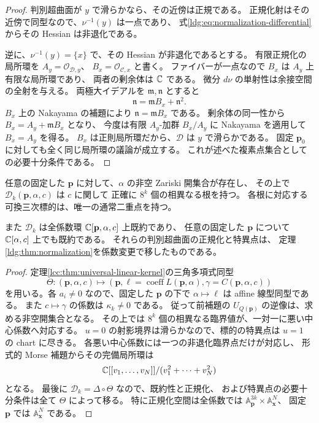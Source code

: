 \begin{proof}
判別超曲面が $y$ で滑らかなら、その近傍は正規である。
正規化射はその近傍で同型なので、$\nu^{-1}(y)$ は一点であり、
式\eqref{ldg:eq:normalization-differential}からその Hessian は非退化である。

逆に、$\nu^{-1}(y)=\{x\}$ で、その Hessian が非退化であるとする。
有限正規化の局所環を $A_y=\mathcal O_{\mathscr D,y}$、
$B_x=\mathcal O_{\mathscr C,x}$ と書く。
ファイバーが一点なので $B_x$ は $A_y$ 上有限な局所環であり、
両者の剰余体は $\mathbb C$ である。
微分 $d\nu$ の単射性は余接空間の全射を与える。
両極大イデアルを $\mathfrak m,\mathfrak n$ とすると
\[
 \mathfrak n=\mathfrak mB_x+\mathfrak n^2.
\]
$B_x$ 上の Nakayama の補題により
$\mathfrak n=\mathfrak mB_x$ である。
剰余体の同一性から $B_x=A_y+\mathfrak mB_x$ となり、
今度は有限 $A_y$-加群 $B_x/A_y$ に Nakayama を適用して $B_x=A_y$ を得る。
$B_x$ は正則局所環だから、$\mathscr D$ は $y$ で滑らかである。
固定 $\mathbf p_0$ に対しても全く同じ局所環の議論が成立する。
これが述べた複素点集合としての必要十分条件である。
\end{proof}

\begin{corollary}[各固定線形係数での単純な悪い中心値]
\label{ldg:cor:fixed-linear-parameters}
任意の固定した $\mathbf p$ に対して、$\alpha$ の非空 Zariski 開集合が存在し、
その上で $\mathscr D_k(\mathbf p,\alpha,c)$ は $c$ に関して
正確に $8^k$ 個の相異なる根を持つ。
各根に対応する可換三次標的は、唯一の通常二重点を持つ。

また $\mathscr D_k$ は全係数環 $\mathbb C[\mathbf p,\alpha,c]$ 上既約であり、
任意の固定した $\mathbf p$ について $\mathbb C[\alpha,c]$ 上でも既約である。
それらの判別超曲面の正規化と特異点は、
定理\ref{ldg:thm:normalization}を係数変更で移したものである。
\end{corollary}

\begin{proof}
定理\ref{lcc:thm:universal-linear-kernel}の三角多項式同型
\[
 \Theta:(\mathbf p,\alpha,c)\longmapsto
      (\mathbf p,\ell=\operatorname{coeff}L(\mathbf p,\alpha),
       \gamma=C(\mathbf p,\alpha,c))
\]
を用いる。各 $a_i\ne0$ なので、固定した $\mathbf p$ の下で
$\alpha\mapsto\ell$ は affine 線型同型である。
また $c\mapsto\gamma$ の係数は $\kappa_k\ne0$ である。
従って前補題の $U_{Q(\mathbf p)}$ の逆像は、求める非空開集合となる。
その上では $8^k$ 個の相異なる臨界値が、一対一に悪い中心係数へ対応する。
$u=0$ の射影境界は滑らかなので、標的の特異点は $u=1$ の chart に尽きる。
各悪い中心係数には一つの非退化臨界点だけが対応し、
形式的 Morse 補題からその完備局所環は
\[
 \mathbb C[[v_1,\ldots,v_N]]/(v_1^2+\cdots+v_N^2)
\]
となる。
最後に $\mathscr D_k=\Delta\circ\Theta$ なので、既約性と正規化、
および特異点の必要十分条件は全て $\Theta$ によって移る。
特に正規化空間は全係数では
$\mathbb A^{3k}_{\mathbf p}\times\mathbb A^N_{\mathbf x}$、
固定 $\mathbf p$ では $\mathbb A^N_{\mathbf x}$ である。
\end{proof}

